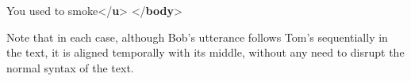 \begin{shaded}
You used to smoke{</\textbf{u}>}\mbox{}\newline 
{}\mbox{}\newline 
\hspace*{1em}\mbox{}\newline 
\hspace*{1em}\mbox{}\newline 
{}\mbox{}\newline 
{</\textbf{body}>}\end{shaded}\egroup\par \par
Note that in each case, although Bob's utterance follows Tom's sequentially in the text, it is aligned temporally with its middle, without any need to disrupt the normal syntax of the text.\par
